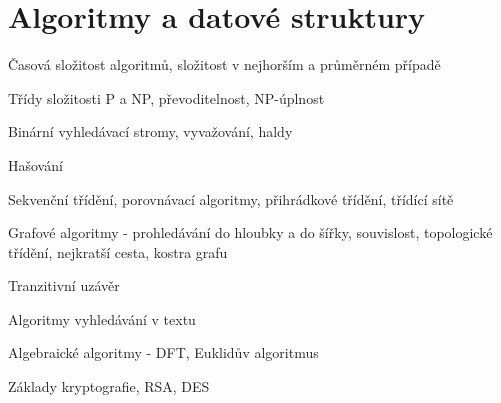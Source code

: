 \section{Algoritmy a datové struktury}
\begin{pozadavky}
\begin{pitemize}
\item Časová složitost algoritmů, složitost v nejhorším a průměrném případě
\item Třídy složitosti P a NP, převoditelnost, NP-úplnost
\item Binární vyhledávací stromy, vyvažování, haldy
\item Hašování
\item Sekvenční třídění, porovnávací algoritmy, přihrádkové třídění, třídící sítě
\item Grafové algoritmy - prohledávání do hloubky a do šířky, souvislost, topologické třídění, nejkratší cesta, kostra grafu
\item Tranzitivní uzávěr
\item Algoritmy vyhledávání v textu
\item Algebraické algoritmy - DFT, Euklidův algoritmus
\item Základy kryptografie, RSA, DES
\end{pitemize}
\end{pozadavky}












